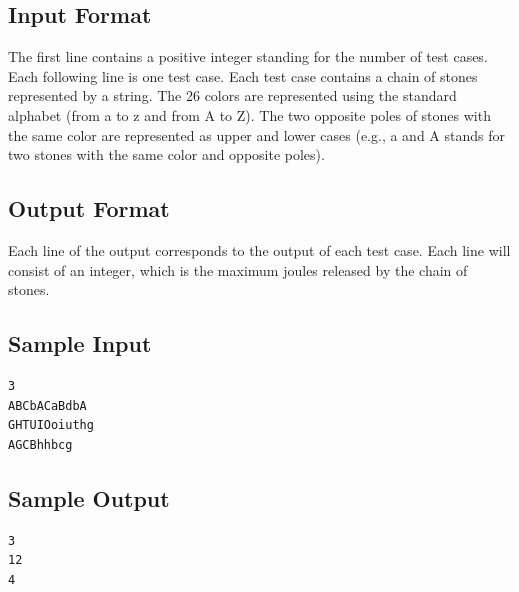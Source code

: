 \documentclass[12pt]{article}
\begin{document}
\subsection*{Input Format}

The first line contains a positive integer standing for the number of test cases. Each following line is one test case. Each test case contains a chain of stones represented by a string. The 26 colors are represented using the standard alphabet (from a to z and from A to Z). The two opposite poles of stones with the same color are represented as upper and lower cases (e.g., a and A stands for two stones with the same color and opposite poles).

\subsection*{Output Format}

Each line of the output corresponds to the output of each test case. Each line will consist of an integer, which is the maximum joules released by the chain of stones.

\subsection*{Sample Input}
\begin{verbatim}
3
ABCbACaBdbA
GHTUIOoiuthg
AGCBhhbcg
\end{verbatim}

\subsection*{Sample Output}
\begin{verbatim}
3
12
4
\end{verbatim}
\end{document}
